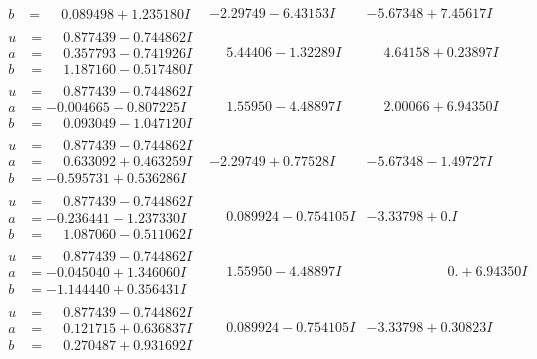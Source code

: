 \documentclass[1p]{elsarticle_modified}
\theoremstyle{definition}
\begin{document}
$$\begin{array}{c|c|c}
\begin{aligned}
b &= \phantom{-}0.089498 + 1.235180 I\end{aligned}
 & -2.29749 - 6.43153 I & -5.67348 + 7.45617 I \\ \hline\begin{aligned}
u &= \phantom{-}0.877439 - 0.744862 I \\
a &= \phantom{-}0.357793 - 0.741926 I \\
b &= \phantom{-}1.187160 - 0.517480 I\end{aligned}
 & \phantom{-}5.44406 - 1.32289 I & \phantom{-}4.64158 + 0.23897 I \\ \hline\begin{aligned}
u &= \phantom{-}0.877439 - 0.744862 I \\
a &= -0.004665 - 0.807225 I \\
b &= \phantom{-}0.093049 - 1.047120 I\end{aligned}
 & \phantom{-}1.55950 - 4.48897 I & \phantom{-}2.00066 + 6.94350 I \\ \hline\begin{aligned}
u &= \phantom{-}0.877439 - 0.744862 I \\
a &= \phantom{-}0.633092 + 0.463259 I \\
b &= -0.595731 + 0.536286 I\end{aligned}
 & -2.29749 + 0.77528 I & -5.67348 - 1.49727 I \\ \hline\begin{aligned}
u &= \phantom{-}0.877439 - 0.744862 I \\
a &= -0.236441 - 1.237330 I \\
b &= \phantom{-}1.087060 - 0.511062 I\end{aligned}
 & \phantom{-}0.089924 - 0.754105 I & -3.33798 + 0. I\phantom{ +0.000000I} \\ \hline\begin{aligned}
u &= \phantom{-}0.877439 - 0.744862 I \\
a &= -0.045040 + 1.346060 I \\
b &= -1.144440 + 0.356431 I\end{aligned}
 & \phantom{-}1.55950 - 4.48897 I & \phantom{-0.000000 -}0. + 6.94350 I \\ \hline\begin{aligned}
u &= \phantom{-}0.877439 - 0.744862 I \\
a &= \phantom{-}0.121715 + 0.636837 I \\
b &= \phantom{-}0.270487 + 0.931692 I\end{aligned}
 & \phantom{-}0.089924 - 0.754105 I & -3.33798 + 0.30823 I \\ \hline\begin{aligned}

\end{aligned}
\end{array}$$
\end{document}
